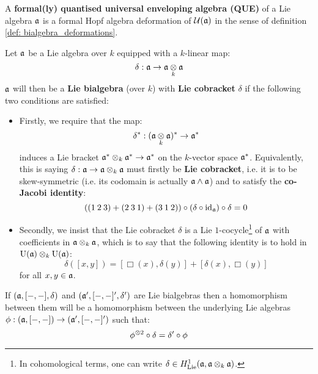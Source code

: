         \begin{definition} \label{def: formal_QUEs}
            A \textbf{formal(ly) quantised universal enveloping algebra (QUE)} of a Lie algebra $\mathfrak{a}$ is a formal Hopf algebra deformation of $\mathcal{U}(\mathfrak{a})$ in the sense of definition \ref{def: bialgebra_deformations}.
        \end{definition}
    
        \begin{definition} \label{def: lie_bialgebras}
            Let $\mathfrak{a}$ be a Lie algebra over $k$ equipped with a $k$-linear map:
                $$\delta: \a \to \a \tensor_k \a$$
            $\mathfrak{a}$ will then be a \textbf{Lie bialgebra} (over $k$) with \textbf{Lie cobracket} $\delta$ if the following two conditions are satisfied:
            \begin{itemize}
                \item Firstly, we require that the map:
                    $$\delta^*: (\a \tensor_k \a)^* \to \a^*$$
                induces a Lie bracket $\a^* \tensor_k \a^* \to \a^*$ on the $k$-vector space $\mathfrak{a}^*$. Equivalently, this is saying $\delta: \a \to \a \tensor_k \a$ must firstly be \textbf{Lie cobracket}, i.e. it is to be skew-symmetric (i.e. its codomain is actually $\mathfrak{a} \wedge \mathfrak{a}$) and to satisfy the \textbf{co-Jacobi identity}:
                    $$( (1 \: 2 \: 3) + (2 \: 3 \: 1) + (3 \: 1 \: 2) ) \circ (\delta \circ \mathrm{id}_{\mathfrak{a}}) \circ \delta = 0$$
                \item Secondly, we insist that the Lie cobracket $\delta$ is a Lie $1$-cocycle\footnote{In cohomological terms, one can write $\delta \in H^1_{\Lie}(\a, \a \tensor_k \a)$.} of $\mathfrak{a}$ with coefficients in $\a \tensor_k \a$, which is to say that the following identity is to hold in $\rmU(\a) \tensor_k \rmU(\a)$:
                    $$\delta( [x, y] ) = [\Box(x), \delta(y)] + [\delta(x), \Box(y)]$$
                for all $x, y \in \mathfrak{a}$.
            \end{itemize}
            If $(\mathfrak{a}, [-, -], \delta)$ and $(\mathfrak{a}', [-, -]', \delta')$ are Lie bialgebras then a homomorphism between them will be a homomorphism between the underlying Lie algebras $\phi: (\mathfrak{a}, [-, -]) \to (\mathfrak{a}', [-, -]')$ such that:
                $$\phi^{\tensor 2} \circ \delta = \delta' \circ \phi$$
        \end{definition}
